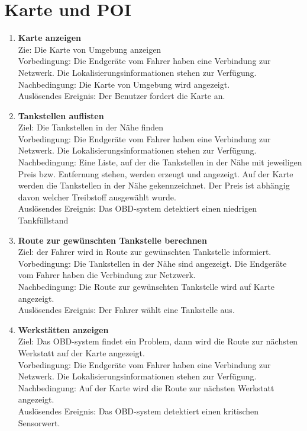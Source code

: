\documentclass[pflichtenheft.tex]{subfiles}
\begin{document}
	
	\section{Karte und POI}
	
	\begin{enumerate}
	\setcounter{enumi}{\value{enumTemp}}
	\item{\textbf{Karte anzeigen}}
		\\Zie: Die Karte von Umgebung anzeigen
		\\Vorbedingung: Die Endgeräte vom Fahrer haben eine Verbindung zur Netzwerk.
		Die Lokalisierungsinformationen stehen zur Verfügung.
		\\Nachbedingung: Die Karte von Umgebung wird angezeigt.
  	 	\\Auslösendes Ereignis: Der Benutzer fordert die Karte an.
  	\item {\textbf{Tankstellen auflisten}}
		\\Ziel: Die Tankstellen in der Nähe finden
		\\Vorbedingung: Die Endgeräte vom Fahrer haben eine Verbindung zur Netzwerk.
		Die Lokalisierungsinformationen stehen zur Verfügung.
		\\Nachbedingung: Eine Liste, auf der die Tankstellen in der Nähe mit
		jeweiligen Preis bzw. Entfernung stehen, werden erzeugt und angezeigt. Auf der
		Karte werden die Tankstellen in der Nähe gekennzeichnet. 
		Der Preis ist abhängig davon welcher Treibstoff ausgewählt wurde.
		\\Auslösendes Ereignis: Das OBD-system detektiert einen niedrigen
		Tankfüllstand
  	
  	\item {\textbf{Route zur gewünschten Tankstelle berechnen}}
  		\\Ziel: der Fahrer wird in Route zur gewünschten Tankstelle informiert. 
  		\\Vorbedingung: Die Tankstellen in der Nähe sind angezeigt. Die Endgeräte
  		vom Fahrer haben die Verbindung zur Netzwerk.
  		\\Nachbedingung: Die Route zur gewünschten Tankstelle wird auf Karte
  		angezeigt.
   		\\Auslösendes Ereignis: Der Fahrer wählt eine Tankstelle aus.
  
	\item{\textbf{Werkstätten anzeigen}} 
		\\Ziel: Das OBD-system findet ein Problem, dann wird die Route zur nächsten
		Werkstatt auf der Karte angezeigt.
		\\Vorbedingung: Die Endgeräte vom Fahrer haben eine Verbindung zur Netzwerk.
		Die Lokalisierungsinformationen stehen zur Verfügung.
		\\Nachbedingung: Auf der Karte wird die Route zur nächsten Werkstatt
		angezeigt.
	 	\\Auslösendes Ereignis: Das OBD-system detektiert einen kritischen Sensorwert.

	\setcounter{enumTemp}{\value{enumi}}
	\end{enumerate}
\end{document}
